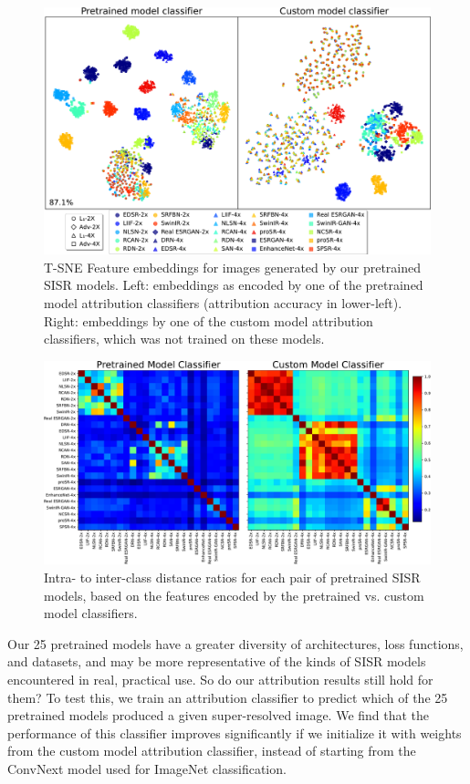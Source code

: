 \documentclass[10pt]{article} %
\begin{document}
\begin{figure}[t]
    \centering
    \includegraphics[width=\textwidth]{figures/pretrained-tsne.pdf}
    \caption{T-SNE Feature embeddings for images generated by our pretrained SISR models. Left: embeddings as encoded by one of the pretrained model attribution classifiers (attribution accuracy in lower-left). Right: embeddings by one of the custom model attribution classifiers, which was not trained on these models. }
    \label{fig:pretrained_tsne}
\end{figure}

\begin{figure}
    \centering
    \includegraphics[width=\textwidth]{figures/pretrained-class-similarity-matrices.pdf}
    \caption{Intra- to inter-class distance ratios for each pair of pretrained SISR models, based on the features encoded by the pretrained vs. custom model classifiers.}
    \label{fig:pretrained-similarity-matrices}
\end{figure}
Our 25 pretrained models have a greater diversity of architectures, loss functions, and datasets, and may be more representative of the kinds of SISR models encountered in real, practical use. So do our attribution results still hold for them? To test this, we train an attribution classifier to predict which of the 25 pretrained models produced a given super-resolved image. We find that the performance of this classifier improves significantly if we initialize it with weights from the custom model attribution classifier, instead of starting from the ConvNext model used for ImageNet classification.
\end{document}
